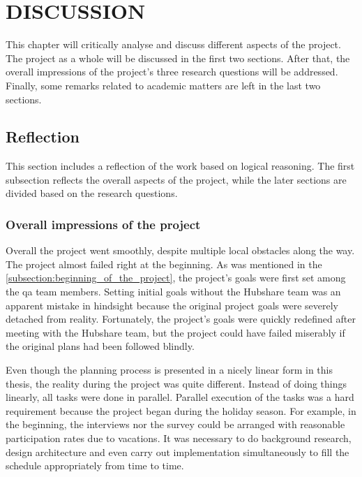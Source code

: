 \chapter{DISCUSSION}\label{chapter:discussion}
This chapter will critically analyse and discuss different aspects of the project. The project as a whole will be discussed in the first two sections. After that, the overall impressions of the project's three research questions will be addressed. Finally, some remarks related to academic matters are left in the last two sections.

\section{Reflection}
This section includes a reflection of the work based on logical reasoning. The first subsection reflects the overall aspects of the project, while the later sections are divided based on the research questions.

\subsection{Overall impressions of the project}
Overall the project went smoothly, despite multiple local obstacles along the way. The project almost failed right at the beginning. As was mentioned in the \autoref{subsection:beginning_of_the_project}, the project's goals were first set among the \gls{qa} team members. Setting initial goals without the Hubshare team was an apparent mistake in hindsight because the original project goals were severely detached from reality. Fortunately, the project's goals were quickly redefined after meeting with the Hubshare team, but the project could have failed miserably if the original plans had been followed blindly.

Even though the planning process is presented in a nicely linear form in this thesis, the reality during the project was quite different. Instead of doing things linearly, all tasks were done in parallel. Parallel execution of the tasks was a hard requirement because the project began during the holiday season. For example, in the beginning, the interviews nor the survey could be arranged with reasonable participation rates due to vacations. It was necessary to do background research, design architecture and even carry out implementation simultaneously to fill the schedule appropriately from time to time.

